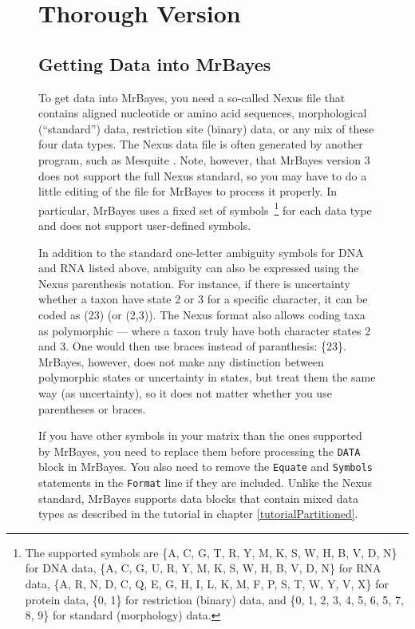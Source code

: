 \documentclass[12pt]{book}
\newcommand{\ttt}[1]{\texttt{#1}}
\begin{document}
\begin{figure}[h]
\section{Thorough Version}

\subsection{Getting Data into MrBayes}

To get data into MrBayes, you need a so-called Nexus file that contains aligned nucleotide or amino
acid sequences, morphological (``standard'') data, restriction site (binary) data, or any mix of
these four data types. The Nexus data file is often generated by another program, such as Mesquite
\citep{maddison06}. Note, however, that MrBayes version 3 does not support the full Nexus standard,
so you may have to do a little editing of the file for MrBayes to process it properly. In
particular, MrBayes uses a fixed set of symbols~\footnote{The supported symbols are \{A, C, G, T, R, 
Y, M, K, S, W, H, B, V, D, N\} for DNA data, \{A, C, G, U, R, Y, M, K, S, W, H, B, V, D, N\} for RNA 
data, \{A, R, N, D, C, Q, E, G, H, I, L, K, M, F, P, S, T, W, Y, V, X\} for protein data, \{0, 1\} 
for restriction (binary) data, and \{0, 1, 2, 3, 4, 5, 6, 5, 7, 8, 9\} for standard (morphology) 
data.} for each data type and does not support user-defined symbols. 

In addition to the standard one-letter ambiguity symbols for DNA and RNA listed above, ambiguity
can also be expressed using the Nexus parenthesis notation. For instance, if there is uncertainty
whether a taxon have state 2 or 3 for a specific character, it can be coded as (23) (or (2,3)).
The Nexus format also allows coding taxa as polymorphic --- where a taxon truly have both character
states 2 and 3. One would then use braces instead of paranthesis: \{23\}. MrBayes, however, does
not make any distinction between polymorphic states or uncertainty in states, but treat them the
same way (as uncertainty), so it does not matter whether you use parentheses or braces.

If you have other symbols in your matrix than the ones supported by MrBayes, you need to replace
them before processing the \ttt{DATA} block in MrBayes. You also need to remove the \ttt{Equate}
and \ttt{Symbols} statements in the \ttt{Format} line if they are included. Unlike the Nexus
standard, MrBayes supports data blocks that contain mixed data types as described in the tutorial
in chapter \ref{tutorialPartitioned}.


\end{figure}
\end{document}

